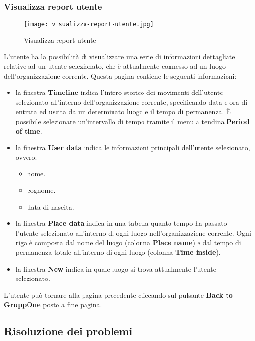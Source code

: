 \documentclass[../manuale-utente.tex]{subfiles}
\begin{document}
\subsubsection{Visualizza report utente}%
\label{subs:visualizza_report_utente}

\begin{figure}[H]
  \centering
  \texttt{[image: visualizza-report-utente.jpg]}
  \caption{Visualizza report utente}%
  \label{fig:web_app_visualizza-report-utente}
\end{figure}
L'utente ha la possibilità di visualizzare una serie di informazioni dettagliate relative ad un utente selezionato, che è attualmente connesso ad un luogo dell'organizzazione corrente.
Questa pagina contiene le seguenti informazioni:
\begin{itemize}
  \item la finestra \textbf{Timeline} indica l'intero storico dei movimenti dell'utente selezionato all'interno dell'organizzazione corrente, specificando data e ora di entrata ed uscita da un determinato luogo e il tempo di permanenza. È possibile selezionare un'intervallo di tempo tramite il menu a tendina \textbf{Period of time}.
  \item la finestra \textbf{User data} indica le informazioni principali dell'utente selezionato, ovvero:
  \begin{itemize}
    \item nome.
    \item cognome.
    \item data di nascita.
  \end{itemize}
  \item la finestra \textbf{Place data} indica in una tabella quanto tempo ha passato l'utente selezionato all'interno di ogni luogo nell'organizzazione corrente. Ogni riga è composta dal nome del luogo (colonna \textbf{Place name}) e dal tempo di permanenza totale all'interno di ogni luogo (colonna \textbf{Time inside}).
  \item la finestra \textbf{Now} indica in quale luogo si trova attualmente l'utente selezionato.
\end{itemize}
L'utente può tornare alla pagina precedente cliccando sul pulsante \textbf{Back to GruppOne} posto a fine pagina. %

\subsection{Risoluzione dei problemi}%
\label{subs:web_app_risoluzione_problemi}
\end{document}
